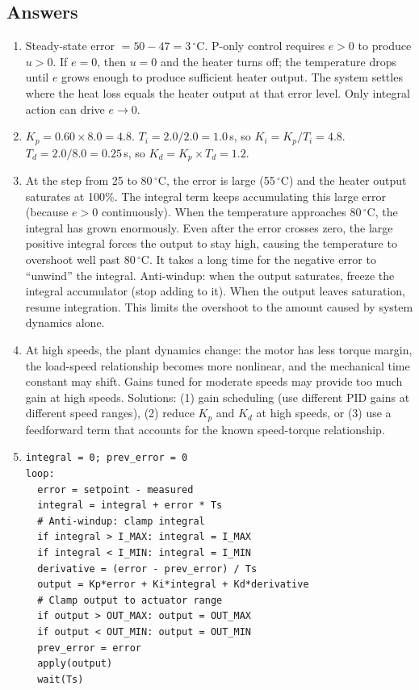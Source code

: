 \documentclass[11pt,letterpaper,twoside,openany]{book}
\newcommand{\degC}{\ensuremath{{}^{\circ}\text{C}}}
\begin{document}
\subsection{Answers}
\begin{enumerate}[leftmargin=1.5em]
\item Steady-state error $= 50 - 47 = 3$\,\degC{}. P-only control requires $e > 0$ to produce $u > 0$. If $e = 0$, then $u = 0$ and the heater turns off; the temperature drops until $e$ grows enough to produce sufficient heater output. The system settles where the heat loss equals the heater output at that error level. Only integral action can drive $e \to 0$.
\item $K_p = 0.60 \times 8.0 = 4.8$. $T_i = 2.0/2.0 = 1.0$\,s, so $K_i = K_p/T_i = 4.8$. $T_d = 2.0/8.0 = 0.25$\,s, so $K_d = K_p \times T_d = 1.2$.
\item At the step from 25 to 80\,\degC{}, the error is large (55\,\degC{}) and the heater output saturates at 100\%. The integral term keeps accumulating this large error (because $e > 0$ continuously). When the temperature approaches 80\,\degC{}, the integral has grown enormously. Even after the error crosses zero, the large positive integral forces the output to stay high, causing the temperature to overshoot well past 80\,\degC{}. It takes a long time for the negative error to ``unwind'' the integral. Anti-windup: when the output saturates, freeze the integral accumulator (stop adding to it). When the output leaves saturation, resume integration. This limits the overshoot to the amount caused by system dynamics alone.
\item At high speeds, the plant dynamics change: the motor has less torque margin, the load-speed relationship becomes more nonlinear, and the mechanical time constant may shift. Gains tuned for moderate speeds may provide too much gain at high speeds. Solutions: (1) gain scheduling (use different PID gains at different speed ranges), (2) reduce $K_p$ and $K_d$ at high speeds, or (3) use a feedforward term that accounts for the known speed-torque relationship.
\item \begin{verbatim}
integral = 0; prev_error = 0
loop:
  error = setpoint - measured
  integral = integral + error * Ts
  # Anti-windup: clamp integral
  if integral > I_MAX: integral = I_MAX
  if integral < I_MIN: integral = I_MIN
  derivative = (error - prev_error) / Ts
  output = Kp*error + Ki*integral + Kd*derivative
  # Clamp output to actuator range
  if output > OUT_MAX: output = OUT_MAX
  if output < OUT_MIN: output = OUT_MIN
  prev_error = error
  apply(output)
  wait(Ts)
\end{verbatim}
\end{enumerate}
\end{document}
